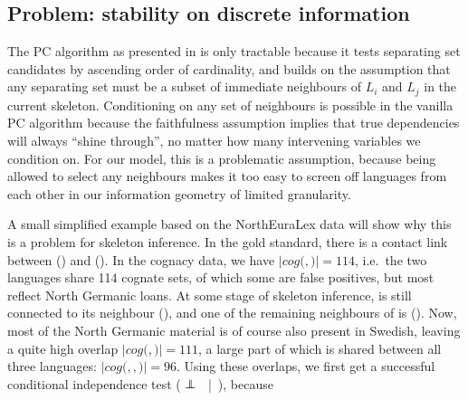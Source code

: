 \subsection{Problem: stability on discrete information}
The PC algorithm as presented in  is only tractable because it tests separating set candidates by ascending order of cardinality, and builds on the assumption that any separating set must be a subset of immediate neighbours of $L_i$ and $L_j$ in the current skeleton. Conditioning on any set of neighbours is possible in the vanilla PC algorithm because the faithfulness assumption implies that true dependencies will always ``shine through'', no matter how many intervening variables we condition on. For our model, this is a problematic assumption, because being allowed to select any neighbours makes it too easy to screen off languages from each other in our information geometry of limited granularity.

A small simplified example based on the NorthEuraLex data will show why this is a problem for skeleton inference. In the gold standard, there is a contact link between  () and  (). In the cognacy data, we have $|cog($$,$$)| = 114$, i.e.\ the two languages share 114 cognate sets, of which some are false positives, but most reflect North Germanic loans. At some stage of skeleton inference,  is still connected to its neighbour  (), and one of the remaining neighbours of  is  (). Now, most of the North Germanic material is of course also present in Swedish, leaving a quite high overlap $|cog($$,$$)| = 111$, a large part of which is shared between all three languages: $|cog($$,$$,$$)| = 96$. Using these overlaps, we first get a successful conditional independence test ( $\indep$ \ |\ ), because


